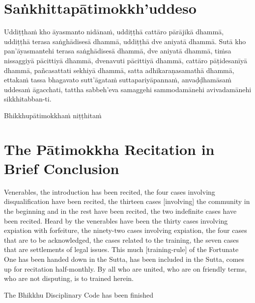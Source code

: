 \section{Saṅkhittapātimokkh'uddeso}
\label{sankhittapatimokkh'uddeso}
Uddiṭṭhaṁ kho āyasmanto nidānaṁ, uddiṭṭhā cattāro pārājikā dhammā, uddiṭṭhā terasa saṅghādisesā dhammā, uddiṭṭhā dve aniyatā dhammā. Sutā kho pan'āyasmantehi terasa saṅghādisesā dhammā, dve aniyatā dhammā, tiṁsa nissaggiyā pācittiyā dhammā, dvenavuti pācittiyā dhammā, cattāro pāṭidesanīyā dhammā, pañcasattati sekhiyā dhammā, satta adhikaraṇasamathā dhammā, ettakaṁ tassa bhagavato sutt'āgataṁ suttapariyāpannaṁ, anvaḍḍhamāsaṁ uddesaṁ āgacchati, tattha sabbeh'eva samaggehi sammodamānehi avivadamānehi sikkhitabban-ti.

\begin{outro}
Bhikkhupātimokkhaṁ niṭṭhitaṁ
\end{outro}

\clearpage

\section{The Pātimokkha Recitation in Brief Conclusion}
\label{patimokkha-in-brief-conclusion}

Venerables, the introduction has been recited, the four cases involving disqualification have been recited, the thirteen cases [involving] the community in the beginning and in the rest have been recited, the two indefinite cases have been recited. Heard by the venerables have been the thirty cases involving expiation with forfeiture, the ninety-two cases involving expiation, the four cases that are to be acknowledged, the cases related to the training, the seven cases that are settlements of legal issues. This much [training-rule] of the Fortunate One has been handed down in the Sutta, has been included in the Sutta, comes up for recitation half-monthly. By all who are united, who are on friendly terms, who are not disputing, is to trained herein.

\begin{outro}
  The Bhikkhu Disciplinary Code has been finished
\end{outro}

\clearpage
